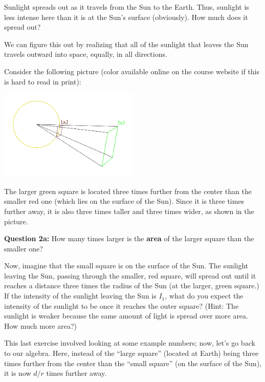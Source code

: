 \documentclass[11pt]{article}
\def\BC{\begin{center}}
\def\EC{\end{center}}
\begin{document}
Sunlight spreads out as it travels from the Sun to the Earth. Thus, sunlight is less intense here than it is at the Sun's surface (obviously). How much does it spread out?

We can figure this out by realizing that all of the sunlight that leaves the Sun travels outward into space, equally, in all directions.

Consider the following picture (color available online on the course website if this is hard to read in print):

\BC
\includegraphics[width=0.5\textwidth]{expansion.png}
\EC

The larger green square is located three times further from the center than the smaller red one (which lies on the surface of the Sun). Since it is three times further away, it is also
three times taller and three times wider, as shown in the picture.

{\bf Question 2a:} How many times larger is the {\bf area} of the larger square than the smaller one?

\vspace*{2cm}

\hrulefill
\newpage
Now, imagine that the small square is on the surface of the Sun. The sunlight leaving the Sun, passing through the smaller, red square, 
will spread out until it reaches a distance three times 
the radius of the Sun (at the larger, green square.) If the intensity of the sunlight leaving the Sun is $I_1$, what do you expect the intensity of the sunlight to be once it reaches 
the outer square? (Hint: The sunlight is weaker because the same amount of light is spread over more area. How much more area?)

\vspace*{5cm}

\hrulefill

This last exercise involved looking at some example numbers; now, let's go back to our algebra. Here, instead of the ``large square'' (located at Earth) being three times further from the 
center than the ``small square'' (on the surface of the Sun), it is now $d/r$ times further away.
\end{document}
